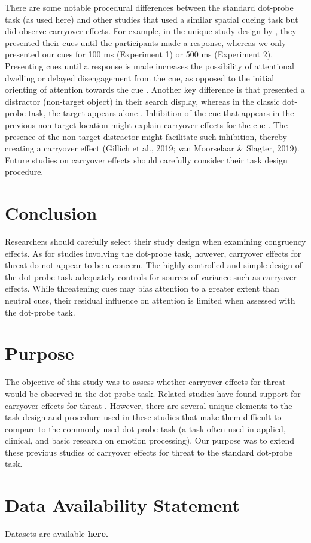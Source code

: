 \documentclass[issue,header,twocolumn,empirical, authordate,10pt]{jote-new-article}
\begin{document}
There are some notable procedural differences between the standard dot-probe task (as used here) and other studies that used a similar spatial cueing task but did observe carryover effects. For example, in the unique study design by \parencite{Gladwin2019b, Gladwin2020a}, they presented their cues until the participants made a response, whereas we only presented our cues for 100 ms (Experiment 1) or 500 ms (Experiment 2). Presenting cues until a response is made increases the possibility of attentional dwelling or delayed disengagement from the cue, as opposed to the initial orienting of attention towards the cue \parencite{Fox2001}. Another key difference is that \parencite{Gladwin2019b, Gladwin2020a} presented a distractor (non-target object) in their search display, whereas in the classic dot-probe task, the target appears alone \parencite{Mogg1998}. Inhibition of the cue that appears in the previous non-target location might explain carryover effects for the cue \parencite{Gladwin2020}. The presence of the non-target distractor might facilitate such inhibition, thereby creating a carryover effect \parencite{Gillich2019, Moorselaar2019}(Gillich et al., 2019; van Moorselaar \& Slagter, 2019). Future studies on carryover effects should carefully consider their task design procedure.

\section{Conclusion}

Researchers should carefully select their study design when examining congruency effects. As for studies involving the dot-probe task, however, carryover effects for threat do not appear to be a concern. The highly controlled and simple design of the dot-probe task adequately controls for sources of variance such as carryover effects. While threatening cues may bias attention to a greater extent than neutral cues, their residual influence on attention is limited when assessed with the dot-probe task.


\section{Purpose }

The objective of this study was to assess whether carryover effects for threat would be observed in the dot-probe task. Related studies have found support for carryover effects for threat \parencite{Gladwin2017, Gladwin2017, Gladwin2019, Gladwin2020, Gladwin2019a}. However, there are several unique elements to the task design and procedure used in these studies that make them difficult to compare to the commonly used dot-probe task (a task often used in applied, clinical, and basic research on emotion processing). Our purpose was to extend these previous studies of carryover effects for threat to the standard dot-probe task.

\section{Data Availability Statement}

Datasets are available \textbf{\href{https://osf.io/7qhsj/?view\_only=07b52294c1b647829644a833fc3d4883}{here}.}


\printbibliography
\end{document}
